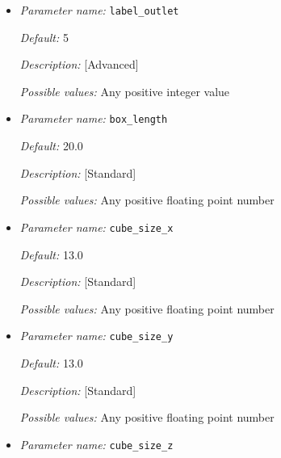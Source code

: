 \begin{itemize}
{\it Default:} 4

{\it Description:} [Advanced] 

{\it Possible values:} Any positive integer value 


\item {\it Parameter name:} {\tt label\_outlet}
\label{parameters:label_outlet}


{\it Default:} 5

{\it Description:} [Advanced] 

{\it Possible values:} Any positive integer value 


\item {\it Parameter name:} {\tt box\_length}
\label{parameters:box_length}


{\it Default:} 20.0

{\it Description:} [Standard] 

{\it Possible values:} Any positive floating point number 


\item {\it Parameter name:} {\tt cube\_size\_x}
\label{parameters:cube_size_x}


{\it Default:} 13.0

{\it Description:} [Standard] 

{\it Possible values:} Any positive floating point number 


\item {\it Parameter name:} {\tt cube\_size\_y}
\label{parameters:cube_size_y}


{\it Default:} 13.0

{\it Description:} [Standard] 

{\it Possible values:} Any positive floating point number 


\item {\it Parameter name:} {\tt cube\_size\_z}
\label{parameters:cube_size_z}



\end{itemize}
